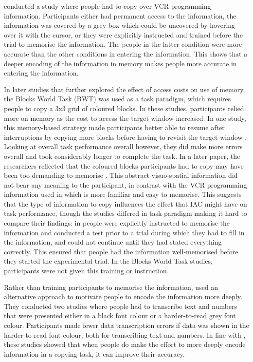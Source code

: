 \documentclass[11pt,oneside]{report}
\begin{document}
\citet{Gray2004} conducted a study where people had to copy over VCR programming information. Participants either had permanent access to the information, the information was covered by a grey box which could be uncovered by hovering over it with the cursor, or they were explicitly instructed and trained before the trial to memorise the information. The people in the latter condition were more accurate than the other conditions in entering the information. This shows that a deeper encoding of the information in memory makes people more accurate in entering the information. 

In later studies that further explored the effect of access costs on use of memory, the Blocks World Task (BWT) was used as a task paradigm, which requires people to copy a 3x3 grid of coloured blocks. In these studies, participants relied more on memory as the cost to access the target window increased. In one study, this memory-based strategy made participants better able to resume after interruptions by copying more blocks before having to revisit the target window \citep{Morgan2009}. Looking at overall task performance overall however, they did make more errors overall and took considerably longer to complete the task. In a later paper, the researchers reflected that the coloured blocks participants had to copy may have been too demanding to memorise \citep{Waldron2011}. This abstract visuo-spatial information did not bear any meaning to the participant, in contrast with the VCR programming information used in \citet{Gray2004} which is more familiar and easy to memorise. This suggests that the type of information to copy influences the effect that IAC might have on task performance, though the studies differed in task paradigm making it hard to compare their findings: in \citet{Gray2004} people were explicitly instructed to memorise the information and conducted a test prior to a trial during which they had to fill in the information, and could not continue until they had stated everything correctly. This ensured that people had the information well-memorised before they started the experimental trial. In the Blocks World Task studies, participants were not given this training or instruction.

Rather than training participants to memorise the information, \citet{Soboczenski2013} used an alternative approach to motivate people to encode the information more deeply. They conducted two studies where people had to transcribe text and numbers that were presented either in a black font colour or a harder-to-read grey font colour. Participants made fewer data transcription errors if data was shown in the harder-to-read font colour, both for transcribing text and numbers. In line with \citet{Gray2004}, these studies showed that when people do make the effort to more deeply encode information in a copying task, it can improve their accuracy.
\end{document}
